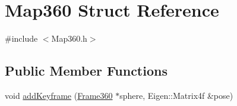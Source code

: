 \hypertarget{structMap360}{\section{Map360 Struct Reference}
\label{structMap360}
}


{\ttfamily \#include $<$Map360.\-h$>$}

\subsection*{Public Member Functions}
\begin{DoxyCompactItemize}
\item 
void \hyperlink{structMap360_a234de9f05d5f88e7768df98fe86bb704}{add\-Keyframe} (\hyperlink{classFrame360}{Frame360} $\ast$sphere, Eigen\-::\-Matrix4f \&pose)
\end{DoxyCompactItemize}
